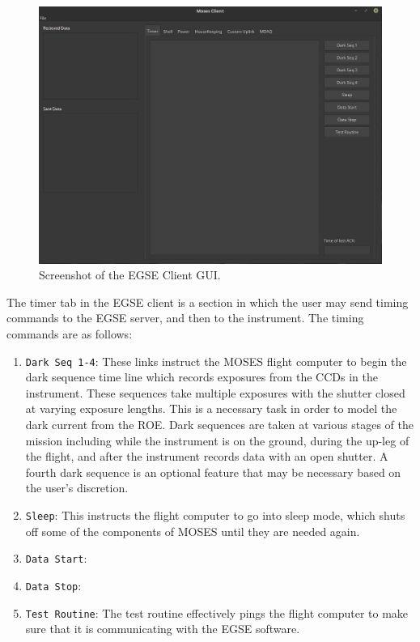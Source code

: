 \documentclass[11pt,titlepage]{article}
\begin{document}
	\begin{figure}[h]
		\includegraphics[width=\textwidth]{EGSE_client_image}
		\caption{Screenshot of the EGSE Client GUI.}
	\end{figure}
	
	The timer tab in the EGSE client is a section in which the user may send timing commands to the EGSE server, and then to the instrument. The timing commands are as follows:
	\begin{enumerate}
		\item \texttt{Dark Seq 1-4}: These links instruct the MOSES flight computer to begin the dark sequence time line which records exposures from the CCDs in the instrument. These sequences take multiple exposures with the shutter closed at varying exposure lengths. This is a necessary task in order to model the dark current from the ROE. Dark sequences are taken at various stages of the mission including while the instrument is on the ground, during the up-leg of the flight, and after the instrument records data with an open shutter. A fourth dark sequence is an optional feature that may be necessary based on the user's discretion.
		\item \texttt{Sleep}: This instructs the flight computer to go into sleep mode, which shuts off some of the components of MOSES until they are needed again.
		\item \texttt{Data Start}:
		\item \texttt{Data Stop}:
		\item \texttt{Test Routine}: The test routine effectively pings the flight computer to make sure that it is communicating with the EGSE software. 
	\end{enumerate}
\end{document}
